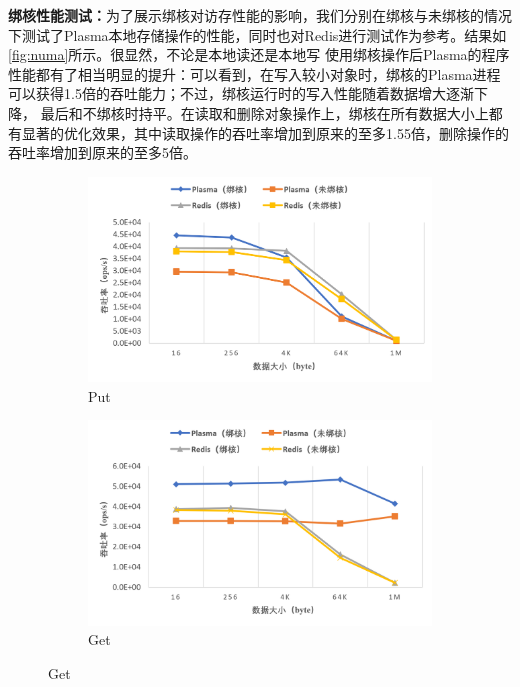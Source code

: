 \textbf{绑核性能测试：}为了展示绑核对访存性能的影响，我们分别在绑核与未绑核的情况下测试了Plasma本地存储操作的性能，同时也对Redis进行测试作为参考。结果如\autoref{fig:numa}所示。很显然，不论是本地读还是本地写
使用绑核操作后Plasma的程序性能都有了相当明显的提升：可以看到，在写入较小对象时，绑核的Plasma进程可以获得1.5倍的吞吐能力；不过，绑核运行时的写入性能随着数据增大逐渐下降，
最后和不绑核时持平。在读取和删除对象操作上，绑核在所有数据大小上都有显著的优化效果，其中读取操作的吞吐率增加到原来的至多1.55倍，删除操作的吞吐率增加到原来的至多5倍。

\begin{figure}[h]
    \begin{subfigure}{0.49\textwidth}
        \includegraphics[width=\textwidth]{image/chap04/put.png}
        \caption{Put}
    \end{subfigure}
    \begin{subfigure}{0.49\textwidth}
        \includegraphics[width=\textwidth]{image/chap04/get.png}
        \caption{Get}
    \end{subfigure}

\end{figure}
